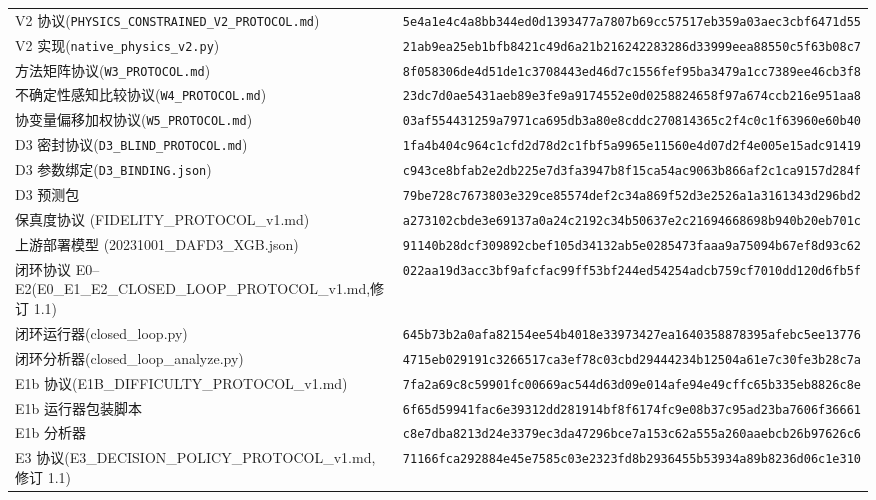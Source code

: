 \documentclass[11pt,a4paper]{ctexart}
\begin{document}
\begin{center}
{\begin{tabular}{ll}
V2 协议(\texttt{PHYSICS\_CONSTRAINED\_V2\_PROTOCOL.md}) & \texttt{5e4a1e4c4a8bb344ed0d1393477a7807b69cc57517eb359a03aec3cbf6471d55} \\
V2 实现(\texttt{native\_physics\_v2.py}) & \texttt{21ab9ea25eb1bfb8421c49d6a21b216242283286d33999eea88550c5f63b08c7} \\
方法矩阵协议(\texttt{W3\_PROTOCOL.md}) & \texttt{8f058306de4d51de1c3708443ed46d7c1556fef95ba3479a1cc7389ee46cb3f8} \\
不确定性感知比较协议(\texttt{W4\_PROTOCOL.md}) & \texttt{23dc7d0ae5431aeb89e3fe9a9174552e0d0258824658f97a674ccb216e951aa8} \\
协变量偏移加权协议(\texttt{W5\_PROTOCOL.md}) & \texttt{03af554431259a7971ca695db3a80e8cddc270814365c2f4c0c1f63960e60b40} \\
D3 密封协议(\texttt{D3\_BLIND\_PROTOCOL.md}) & \texttt{1fa4b404c964c1cfd2d78d2c1fbf5a9965e11560e4d07d2f4e005e15adc91419} \\
D3 参数绑定(\texttt{D3\_BINDING.json}) & \texttt{c943ce8bfab2e2db225e7d3fa3947b8f15ca54ac9063b866af2c1ca9157d284f} \\
D3 预测包 & \texttt{79be728c7673803e329ce85574def2c34a869f52d3e2526a1a3161343d296bd2} \\
保真度协议 (FIDELITY\_PROTOCOL\_v1.md) & \texttt{a273102cbde3e69137a0a24c2192c34b50637e2c21694668698b940b20eb701c} \\
上游部署模型 (20231001\_DAFD3\_XGB.json) & \texttt{91140b28dcf309892cbef105d34132ab5e0285473faaa9a75094b67ef8d93c62} \\
闭环协议 E0--E2(E0\_E1\_E2\_CLOSED\_LOOP\_PROTOCOL\_v1.md,修订 1.1) & \texttt{022aa19d3acc3bf9afcfac99ff53bf244ed54254adcb759cf7010dd120d6fb5f} \\
闭环运行器(closed\_loop.py) & \texttt{645b73b2a0afa82154ee54b4018e33973427ea1640358878395afebc5ee13776} \\
闭环分析器(closed\_loop\_analyze.py) & \texttt{4715eb029191c3266517ca3ef78c03cbd29444234b12504a61e7c30fe3b28c7a} \\
E1b 协议(E1B\_DIFFICULTY\_PROTOCOL\_v1.md) & \texttt{7fa2a69c8c59901fc00669ac544d63d09e014afe94e49cffc65b335eb8826c8e} \\
E1b 运行器包装脚本 & \texttt{6f65d59941fac6e39312dd281914bf8f6174fc9e08b37c95ad23ba7606f36661} \\
E1b 分析器 & \texttt{c8e7dba8213d24e3379ec3da47296bce7a153c62a555a260aaebcb26b97626c6} \\
E3 协议(E3\_DECISION\_POLICY\_PROTOCOL\_v1.md,修订 1.1) & \texttt{71166fca292884e45e7585c03e2323fd8b2936455b53934a89b8236d06c1e310} \\

\end{tabular}}
\end{center}
\end{document}
